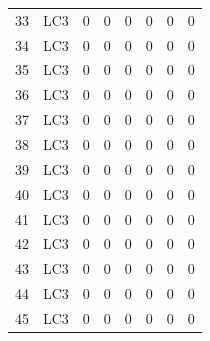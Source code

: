 \documentclass{article}%
\begin{document}
\begin{longtable}{| c c | c c c c c c |}
33&LC3&0&0&0&0&0&0\\%
34&LC3&0&0&0&0&0&0\\%
35&LC3&0&0&0&0&0&0\\%
36&LC3&0&0&0&0&0&0\\%
37&LC3&0&0&0&0&0&0\\%
38&LC3&0&0&0&0&0&0\\%
39&LC3&0&0&0&0&0&0\\%
40&LC3&0&0&0&0&0&0\\%
41&LC3&0&0&0&0&0&0\\%
42&LC3&0&0&0&0&0&0\\%
43&LC3&0&0&0&0&0&0\\%
44&LC3&0&0&0&0&0&0\\%
45&LC3&0&0&0&0&0&0\\%
\end{longtable}

%
\end{document}
